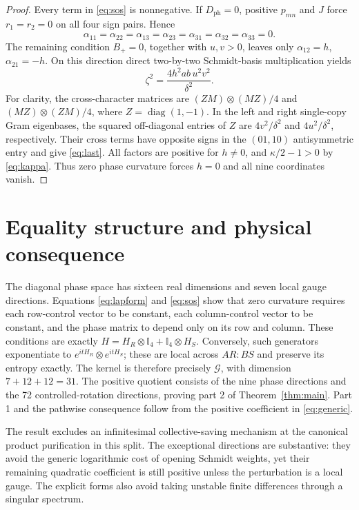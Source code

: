 \documentclass[11pt]{article}
\newcommand{\diag}{\operatorname{diag}}
\newcommand{\id}{\mathbb I}
\newcommand{\cG}{\mathcal G}
\begin{document}
\begin{proof}
Every term in \eqref{eq:sos} is nonnegative. If $D_{\mathrm{ph}}=0$, positive $p_{mn}$ and $J$ force $r_1=r_2=0$ on all four sign pairs. Hence
\[
 \alpha_{11}=\alpha_{22}=\alpha_{13}=\alpha_{23}
 =\alpha_{31}=\alpha_{32}=\alpha_{33}=0.
\]
The remaining condition $B_+=0$, together with $u,v>0$, leaves only $\alpha_{12}=h$, $\alpha_{21}=-h$. On this direction direct two-by-two Schmidt-basis multiplication yields
\begin{equation}\label{eq:last}
 \zeta^2=\frac{4h^2ab\,u^2v^2}{\delta^2}.
\end{equation}
For clarity, the cross-character matrices are $(ZM)\otimes(MZ)/4$ and $(MZ)\otimes(ZM)/4$, where $Z=\diag(1,-1)$. In the left and right single-copy Gram eigenbases, the squared off-diagonal entries of $Z$ are $4v^2/\delta^2$ and $4u^2/\delta^2$, respectively. Their cross terms have opposite signs in the $(01,10)$ antisymmetric entry and give \eqref{eq:last}. All factors are positive for $h\ne0$, and $\kappa/2-1>0$ by \eqref{eq:kappa}. Thus zero phase curvature forces $h=0$ and all nine coordinates vanish.
\end{proof}

\section{Equality structure and physical consequence}
The diagonal phase space has sixteen real dimensions and seven local gauge directions. Equations \eqref{eq:lapform} and \eqref{eq:sos} show that zero curvature requires each row-control vector to be constant, each column-control vector to be constant, and the phase matrix to depend only on its row and column. These conditions are exactly
$H=H_R\otimes\id_4+\id_4\otimes H_S$. Conversely, such generators exponentiate to $e^{itH_R}\otimes e^{itH_S}$; these are local across $AR:BS$ and preserve its entropy exactly. The kernel is therefore precisely $\cG$, with dimension $7+12+12=31$. The positive quotient consists of the nine phase directions and the 72 controlled-rotation directions, proving part 2 of Theorem~\ref{thm:main}. Part 1 and the pathwise consequence follow from the positive coefficient in \eqref{eq:generic}.

The result excludes an infinitesimal collective-saving mechanism at the canonical product purification in this split. The exceptional directions are substantive: they avoid the generic logarithmic cost of opening Schmidt weights, yet their remaining quadratic coefficient is still positive unless the perturbation is a local gauge. The explicit forms also avoid taking unstable finite differences through a singular spectrum.
\end{document}

